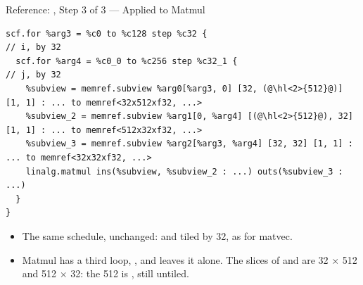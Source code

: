\documentclass[aspectratio=169,10pt]{beamer}
\begin{document}
\begin{frame}[fragile]{Reference: , Step 3 of 3 --- Applied to Matmul}
\begin{lstlisting}[language=mlir,basicstyle=\ttfamily\fontsize{6.6}{7.9}\selectfont]
scf.for %arg3 = %c0 to %c128 step %c32 {                                 // i, by 32
  scf.for %arg4 = %c0_0 to %c256 step %c32_1 {                           // j, by 32
    %subview = memref.subview %arg0[%arg3, 0] [32, (@\hl<2>{512}@)] [1, 1] : ... to memref<32x512xf32, ...>
    %subview_2 = memref.subview %arg1[0, %arg4] [(@\hl<2>{512}@), 32] [1, 1] : ... to memref<512x32xf32, ...>
    %subview_3 = memref.subview %arg2[%arg3, %arg4] [32, 32] [1, 1] : ... to memref<32x32xf32, ...>
    linalg.matmul ins(%subview, %subview_2 : ...) outs(%subview_3 : ...)
  }
}
\end{lstlisting}
  \vspace{0.4em}
  \begin{itemize}
    \item<1-> The same schedule, unchanged:  and  tiled by 32,
      as for matvec.
    \item<2-> Matmul has a third loop, , and \cd{[32, 32]} leaves it
      alone. The slices of  and  are 32 $\times$ \alert{512} and
      \alert{512} $\times$ 32: the 512 is , still untiled.
  \end{itemize}
\end{frame}
\end{document}
